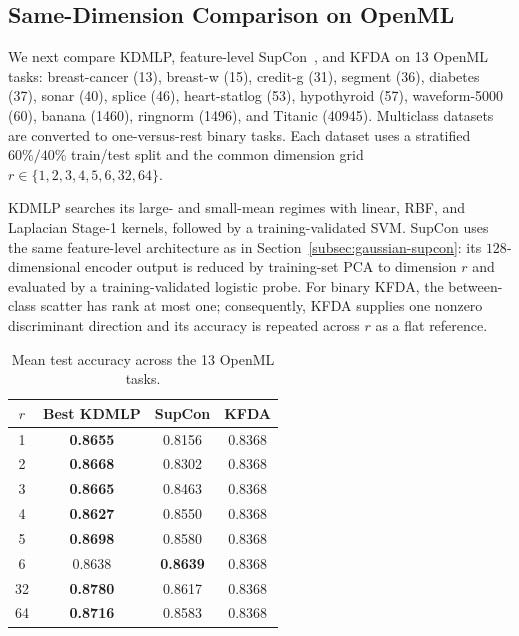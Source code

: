 \subsection{Same-Dimension Comparison on OpenML}
\label{subsec:openml-supcon}

We next compare KDMLP, feature-level SupCon~\cite{khosla2020supervised}, and KFDA
on 13 OpenML tasks: breast-cancer (13), breast-w (15), credit-g (31), segment
(36), diabetes (37), sonar (40), splice (46), heart-statlog (53), hypothyroid
(57), waveform-5000 (60), banana (1460), ringnorm (1496), and Titanic (40945).
Multiclass datasets are converted to one-versus-rest binary tasks.  Each dataset
uses a stratified $60\%/40\%$ train/test split and the common dimension grid
$r\in\{1,2,3,4,5,6,32,64\}$.

KDMLP searches its large- and small-mean regimes with linear, RBF, and Laplacian
Stage-1 kernels, followed by a training-validated SVM.  SupCon uses the same
feature-level architecture as in Section~\ref{subsec:gaussian-supcon}: its
$128$-dimensional encoder output is reduced by training-set PCA to dimension $r$
and evaluated by a training-validated logistic probe.  For binary KFDA, the
between-class scatter has rank at most one; consequently, KFDA supplies one
nonzero discriminant direction and its accuracy is repeated across $r$ as a flat
reference.

\begin{table}[t]
\centering
\caption{Mean test accuracy across the 13 OpenML tasks.}
\label{tab:openml-supcon-same-r}
\small
\begin{tabular}{c c c c}
\toprule
$r$ & Best KDMLP & SupCon & KFDA \\
\midrule
1  & \textbf{0.8655} & 0.8156 & 0.8368 \\
2  & \textbf{0.8668} & 0.8302 & 0.8368 \\
3  & \textbf{0.8665} & 0.8463 & 0.8368 \\
4  & \textbf{0.8627} & 0.8550 & 0.8368 \\
5  & \textbf{0.8698} & 0.8580 & 0.8368 \\
6  & 0.8638 & \textbf{0.8639} & 0.8368 \\
32 & \textbf{0.8780} & 0.8617 & 0.8368 \\
64 & \textbf{0.8716} & 0.8583 & 0.8368 \\
\bottomrule
\end{tabular}
\end{table}

